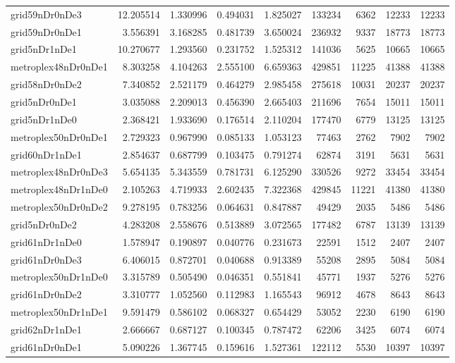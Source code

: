 \begin{longtable}{|l|r|r|r|r|r|r|r|r|}
grid59nDr0nDe3 & 12.205514 & 1.330996 & 0.494031 & 1.825027 & 133234 & 6362 & 12233 & 12233 \\
grid59nDr0nDe1 & 3.556391 & 3.168285 & 0.481739 & 3.650024 & 236932 & 9337 & 18773 & 18773 \\
grid5nDr1nDe1 & 10.270677 & 1.293560 & 0.231752 & 1.525312 & 141036 & 5625 & 10665 & 10665 \\
metroplex48nDr0nDe1 & 8.303258 & 4.104263 & 2.555100 & 6.659363 & 429851 & 11225 & 41388 & 41388 \\
grid58nDr0nDe2 & 7.340852 & 2.521179 & 0.464279 & 2.985458 & 275618 & 10031 & 20237 & 20237 \\
grid5nDr0nDe1 & 3.035088 & 2.209013 & 0.456390 & 2.665403 & 211696 & 7654 & 15011 & 15011 \\
grid5nDr1nDe0 & 2.368421 & 1.933690 & 0.176514 & 2.110204 & 177470 & 6779 & 13125 & 13125 \\
metroplex50nDr0nDe1 & 2.729323 & 0.967990 & 0.085133 & 1.053123 & 77463 & 2762 & 7902 & 7902 \\
grid60nDr1nDe1 & 2.854637 & 0.687799 & 0.103475 & 0.791274 & 62874 & 3191 & 5631 & 5631 \\
metroplex48nDr0nDe3 & 5.654135 & 5.343559 & 0.781731 & 6.125290 & 330526 & 9272 & 33454 & 33454 \\
metroplex48nDr1nDe0 & 2.105263 & 4.719933 & 2.602435 & 7.322368 & 429845 & 11221 & 41380 & 41380 \\
metroplex50nDr0nDe2 & 9.278195 & 0.783256 & 0.064631 & 0.847887 & 49429 & 2035 & 5486 & 5486 \\
grid5nDr0nDe2 & 4.283208 & 2.558676 & 0.513889 & 3.072565 & 177482 & 6787 & 13139 & 13139 \\
grid61nDr1nDe0 & 1.578947 & 0.190897 & 0.040776 & 0.231673 & 22591 & 1512 & 2407 & 2407 \\
grid61nDr0nDe3 & 6.406015 & 0.872701 & 0.040688 & 0.913389 & 55208 & 2895 & 5084 & 5084 \\
metroplex50nDr1nDe0 & 3.315789 & 0.505490 & 0.046351 & 0.551841 & 45771 & 1937 & 5276 & 5276 \\
grid61nDr0nDe2 & 3.310777 & 1.052560 & 0.112983 & 1.165543 & 96912 & 4678 & 8643 & 8643 \\
metroplex50nDr1nDe1 & 9.591479 & 0.586102 & 0.068327 & 0.654429 & 53052 & 2230 & 6190 & 6190 \\
grid62nDr1nDe1 & 2.666667 & 0.687127 & 0.100345 & 0.787472 & 62206 & 3425 & 6074 & 6074 \\
grid61nDr0nDe1 & 5.090226 & 1.367745 & 0.159616 & 1.527361 & 122112 & 5530 & 10397 & 10397 \\

\end{longtable}
